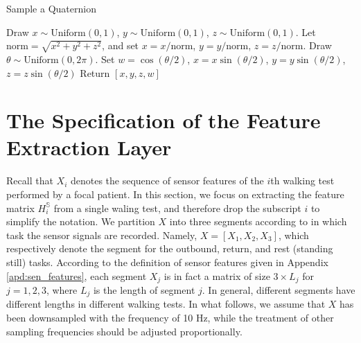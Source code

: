 \documentclass[mnsc]{informs3b} %
\begin{document}
\begin{appendices}
\begin{algorithm}[h]
\caption{Sample a Quaternion}\label{alg:sample_quaternion}
\begin{algorithmic}[1]
\State Draw $x \sim \text{Uniform}(0,1)$, $y \sim \text{Uniform}(0,1)$, $z \sim \text{Uniform}(0,1)$.
\State Let $\text{norm}=\sqrt{x^2+y^2+z^2}$, and set $x=x/\text{norm}$, $y=y/\text{norm}$, $z=z/\text{norm}$.
\State Draw $\theta \sim \text{Uniform}(0,2\pi)$.
\State Set $w=\cos(\theta/2)$, $x=x \sin(\theta/2)$, $y=y \sin(\theta/2)$, $z=z \sin(\theta/2)$
\State Return $[x,y,z,w]$
\end{algorithmic}
\end{algorithm}

\clearpage

\section{The Specification of the Feature Extraction Layer}\label{apd:cnn}

Recall that $X_i$ denotes the sequence of sensor features of the $i$th walking test performed by a focal patient. In this section, we focus on extracting the feature matrix $H_i^\mathbb{S}$ from a single waling test, and therefore drop the subscript $i$ to simplify the notation. 
We partition $X$ into three segments according to in which task the sensor signals are recorded. Namely, $X=[X_{1}, X_{2}, X_{3}]$, which respectively denote the segment for the outbound, return, and rest (standing still) tasks. According to the definition of sensor features given in Appendix \ref{apd:sen_features}, each segment $X_j$ is in fact a matrix of size $3 \times L_j$ for $j=1,2,3$, where $L_j$ is the length of segment $j$. In general, different segments have different lengths in different walking tests. In what follows, we assume that $X$ has been downsampled with the frequency of 10 Hz, while the treatment of other sampling frequencies should be adjusted proportionally.


\end{appendices}
\end{document}

